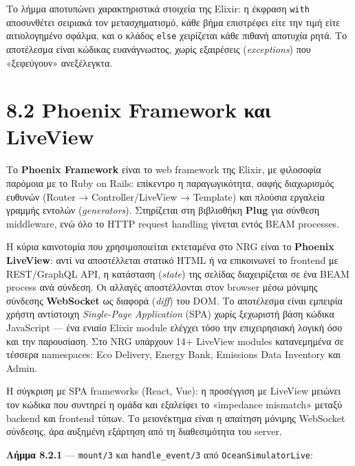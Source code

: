 Το λήμμα αποτυπώνει χαρακτηριστικά στοιχεία της Elixir: η έκφραση
\texttt{with} αποσυνθέτει σειριακά τον μετασχηματισμό, κάθε βήμα
επιστρέφει είτε την τιμή είτε αιτιολογημένο σφάλμα, και ο κλάδος
\texttt{else} χειρίζεται κάθε πιθανή αποτυχία ρητά. Το αποτέλεσμα είναι
κώδικας ευανάγνωστος, χωρίς εξαιρέσεις (\emph{exceptions}) που
«ξεφεύγουν» ανεξέλεγκτα.

\section{8.2 Phoenix Framework και
LiveView}\label{phoenix-framework-ux3baux3b1ux3b9-liveview}

Το \textbf{Phoenix Framework} είναι το web framework της Elixir, με
φιλοσοφία παρόμοια με το Ruby on Rails: επίκεντρο η παραγωγικότητα,
σαφής διαχωρισμός ευθυνών (Router → Controller/LiveView → Template) και
πλούσια εργαλεία γραμμής εντολών (\emph{generators}). Στηρίζεται στη
βιβλιοθήκη \textbf{Plug} για σύνθεση middleware, ενώ όλο το HTTP request
handling γίνεται εντός BEAM processes.

Η κύρια καινοτομία που χρησιμοποιείται εκτεταμένα στο NRG είναι το
\textbf{Phoenix LiveView}: αντί να αποστέλλεται στατικό HTML ή να
επικοινωνεί το frontend με REST/GraphQL API, η κατάσταση (\emph{state})
της σελίδας διαχειρίζεται σε ένα BEAM process ανά σύνδεση. Οι αλλαγές
αποστέλλονται στον browser μέσω μόνιμης σύνδεσης \textbf{WebSocket} ως
διαφορά (\emph{diff}) του DOM. Το αποτέλεσμα είναι εμπειρία χρήστη
αντίστοιχη \emph{Single-Page Application} (SPA) χωρίς ξεχωριστή βάση
κώδικα JavaScript --- ένα ενιαίο Elixir module ελέγχει τόσο την
επιχειρησιακή λογική όσο και την παρουσίαση. Στο NRG υπάρχουν 14+
LiveView modules κατανεμημένα σε τέσσερα namespaces: Eco Delivery,
Energy Bank, Emissions Data Inventory και Admin.

Η σύγκριση με SPA frameworks (React, Vue): η προσέγγιση με LiveView
μειώνει τον κώδικα που συντηρεί η ομάδα και εξαλείφει το «impedance
mismatch» μεταξύ backend και frontend τύπων. Το μειονέκτημα είναι η
απαίτηση μόνιμης WebSocket σύνδεσης, άρα αυξημένη εξάρτηση από τη
διαθεσιμότητα του server.

\textbf{Λήμμα 8.2.1} --- \texttt{mount/3} και \texttt{handle\_event/3}
από \texttt{OceanSimulatorLive}:

